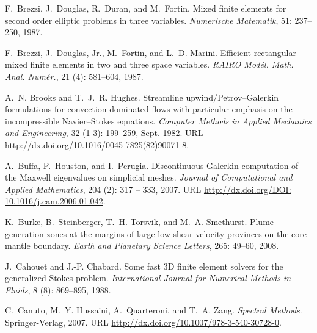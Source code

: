 \begin{thebibliography}{467}
F.~Brezzi, J.~Douglas, R.~Duran, and M.~Fortin.
\newblock Mixed finite elements for second order elliptic problems in three
  variables.
\newblock \emph{Numerische Matematik}, 51: 237--250,
  1987{}.

F.~Brezzi, J.~Douglas, Jr., M.~Fortin, and L.~D. Marini.
\newblock Efficient rectangular mixed finite elements in two and three space
  variables.
\newblock \emph{RAIRO Mod\'el. Math. Anal. Num\'er.}, 21 (4):
  581--604, 1987{}.

A.~N. Brooks and T.~J.~R. Hughes.
\newblock Streamline upwind/{P}etrov--{G}alerkin formulations for convection
  dominated flows with particular emphasis on the incompressible
  {N}avier--{S}tokes equations.
\newblock \emph{Computer Methods in Applied Mechanics and Engineering},
  32 (1-3): 199--259, Sept. 1982.
\newblock URL \url{http://dx.doi.org/10.1016/0045-7825(82)90071-8}.

A.~Buffa, P.~Houston, and I.~Perugia.
\newblock Discontinuous {G}alerkin computation of the {M}axwell eigenvalues on
  simplicial meshes.
\newblock \emph{Journal of Computational and Applied Mathematics}, 204
  (2): 317 -- 333, 2007.
\newblock URL \url{http://dx.doi.org/DOI: 10.1016/j.cam.2006.01.042}.

K.~Burke, B.~Steinberger, T.~H. Torsvik, and M.~A. Smethurst.
\newblock Plume generation zones at the margins of large low shear velocity
  provinces on the core-mantle boundary.
\newblock \emph{Earth and Planetary Science Letters}, 265: 49--60,
  2008.

J.~Cahouet and J.-P. Chabard.
\newblock Some fast {3D} finite element solvers for the generalized {S}tokes
  problem.
\newblock \emph{International Journal for Numerical Methods in Fluids},
  8 (8): 869--895, 1988.

C.~Canuto, M.~Y. Hussaini, A.~Quarteroni, and T.~A. Zang.
\newblock \emph{Spectral Methods}.
\newblock Springer-Verlag, 2007.
\newblock URL \url{http://dx.doi.org/10.1007/978-3-540-30728-0}.


\end{thebibliography}
